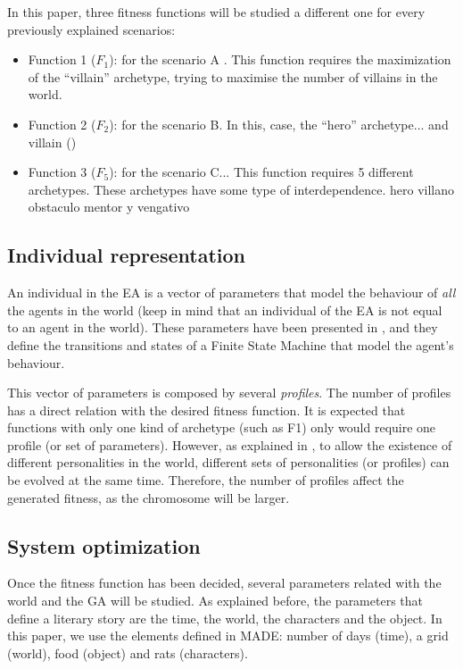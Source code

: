 \documentclass[runningheads,a4paper]{llncs}
\begin{document}
In this paper, three fitness functions will be studied a different one
for every previously explained scenarios:
\begin{itemize}
\item Function 1 ($F_1$): for the scenario A . This function requires the maximization of the ``villain'' archetype, trying to maximise the number of villains in the world. 
\item Function 2 ($F_2$): for the scenario B. In this, case, the ``hero'' archetype... and villain ()
\item Function 3 ($F_5$): for the scenario C... This function requires 5 different archetypes. These archetypes have some type of interdependence. hero villano obstaculo mentor y vengativo %
\end{itemize}

\subsection{Individual representation}


An individual in the EA is a vector of parameters that model the behaviour of {\em all} the agents in the world (keep in mind that an individual of the EA is not equal to an agent in the world). These parameters have been presented in \cite{garcia14my}, and they define the transitions and states of a Finite State Machine that model the agent's behaviour. 

This vector of parameters is composed by several {\em profiles}. The number of profiles has a direct relation with the desired fitness function. It is expected that functions with only one kind of archetype (such as F1) only would require one profile (or set of parameters). However, as explained in \cite{garcia14my}, to allow the existence of different personalities in the world, different sets of personalities (or profiles) can be evolved at the same time. Therefore, the number of profiles affect the generated fitness, as the chromosome will be larger. 


\subsection{System optimization}


Once the fitness function has been decided, several parameters related with the world and the GA will be studied. As explained before, the parameters that define a literary story are the time, the world, the characters and the object. In this paper, we use the elements defined in MADE: number of days (time), a grid (world), food (object) and rats (characters).
\end{document}
